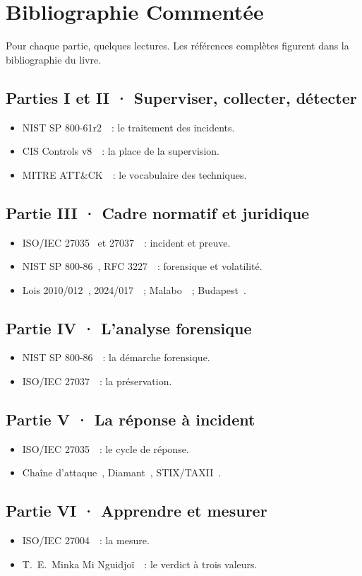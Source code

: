 \chapter{Bibliographie Commentée}
\label{ann:bibliographie}

Pour chaque partie, quelques lectures. Les références complètes figurent dans
la bibliographie du livre.

\section*{Parties I et II · Superviser, collecter, détecter}
\begin{itemize}
    \item NIST SP 800-61r2~\cite{nist80061r2}~: le traitement des incidents.
    \item CIS Controls v8~\cite{cis2021controls}~: la place de la supervision.
    \item MITRE ATT\&CK~\cite{mitreattack}~: le vocabulaire des techniques.
\end{itemize}

\section*{Partie III · Cadre normatif et juridique}
\begin{itemize}
    \item ISO/IEC 27035~\cite{iso27035} et 27037~\cite{iso27037}~: incident et preuve.
    \item NIST SP 800-86~\cite{nist80086}, RFC 3227~\cite{rfc3227}~: forensique et volatilité.
    \item Lois 2010/012~\cite{loi2010012}, 2024/017~\cite{loi2024017}~; Malabo~\cite{malabo2014}~; Budapest~\cite{budapest2001}.
\end{itemize}

\section*{Partie IV · L'analyse forensique}
\begin{itemize}
    \item NIST SP 800-86~\cite{nist80086}~: la démarche forensique.
    \item ISO/IEC 27037~\cite{iso27037}~: la préservation.
\end{itemize}

\section*{Partie V · La réponse à incident}
\begin{itemize}
    \item ISO/IEC 27035~\cite{iso27035}~: le cycle de réponse.
    \item Chaîne d'attaque~\cite{killchain2011}, Diamant~\cite{diamond2013}, STIX/TAXII~\cite{stixtaxii}.
\end{itemize}

\section*{Partie VI · Apprendre et mesurer}
\begin{itemize}
    \item ISO/IEC 27004~\cite{iso27004}~: la mesure.
    \item T.~E.~Minka Mi Nguidjoï~\cite{minka2026auditologie}~: le verdict à trois valeurs.
\end{itemize}
